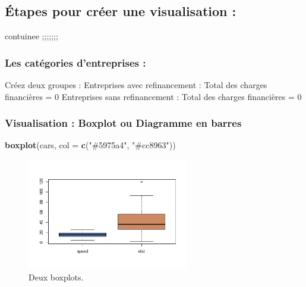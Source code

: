 \documentclass[mstat,12pt]{unswthesis}
\newenvironment{Shaded}{\begin{snugshade}}{\end{snugshade}}
\newcommand{\AttributeTok}[1]{\textcolor[rgb]{0.13,0.29,0.53}{#1}}
\newcommand{\FunctionTok}[1]{\textcolor[rgb]{0.13,0.29,0.53}{\textbf{#1}}}
\newcommand{\NormalTok}[1]{#1}
\newcommand{\StringTok}[1]{\textcolor[rgb]{0.31,0.60,0.02}{#1}}
\begin{document}
\subsection{Étapes pour créer une visualisation
:}\label{uxe9tapes-pour-cruxe9er-une-visualisation-1}

contuinee ;;;;;;;

\subsubsection{Les catégories d'entreprises
:}\label{les-catuxe9gories-dentreprises-1}

\bigskip

Créez deux groupes : Entreprises avec refinancement : Total des charges
financières = 0 Entreprises sans refinancement : Total des charges
financières = 0

\subsubsection{Visualisation : Boxplot ou Diagramme en
barres}\label{visualisation-boxplot-ou-diagramme-en-barres-1}

\begin{Shaded}
\begin{Highlighting}[]
\FunctionTok{boxplot}\NormalTok{(cars, }\AttributeTok{col =} \FunctionTok{c}\NormalTok{(}\StringTok{"\#5975a4"}\NormalTok{, }\StringTok{"\#cc8963"}\NormalTok{))}
\end{Highlighting}
\end{Shaded}

\begin{figure}

{\centering \includegraphics[width=7cm]{scdon2-UPV-report-template_sansPython_files/figure-latex/unnamed-chunk-6-1} 

}

\caption{\label{fig:boxplots}Deux boxplots.}\label{fig:unnamed-chunk-6}
\end{figure}
\end{document}
